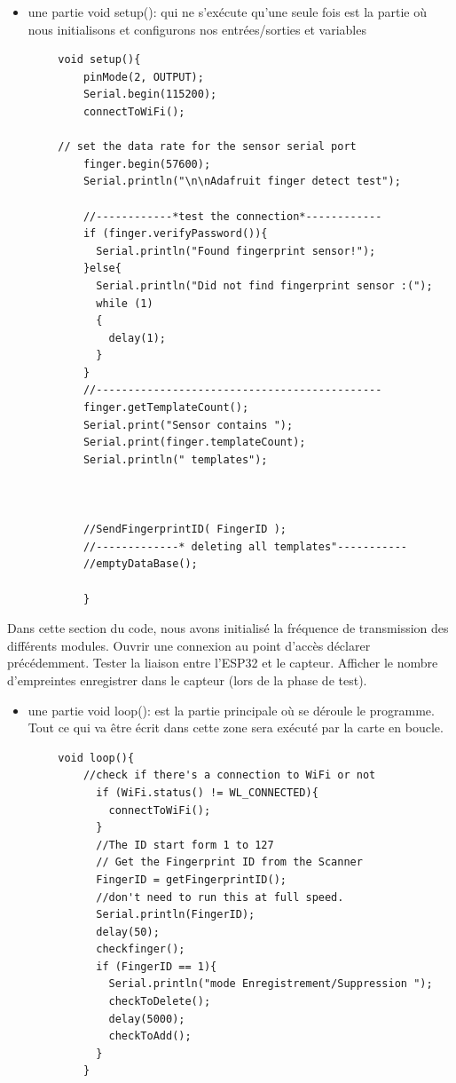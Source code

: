     \begin{itemize}
        \item [\textbullet] une partie void setup(): qui ne s’exécute qu’une seule fois 
        est la partie où nous initialisons et configurons nos entrées/sorties et 
        variables 
    \end{itemize}    
    \begin{verbatim}
        void setup(){
            pinMode(2, OUTPUT);
            Serial.begin(115200);
            connectToWiFi();

        // set the data rate for the sensor serial port
            finger.begin(57600);
            Serial.println("\n\nAdafruit finger detect test");
            
            //------------*test the connection*------------
            if (finger.verifyPassword()){
              Serial.println("Found fingerprint sensor!");
            }else{
              Serial.println("Did not find fingerprint sensor :(");
              while (1)
              {
                delay(1);
              }
            }
            //---------------------------------------------
            finger.getTemplateCount();
            Serial.print("Sensor contains ");
            Serial.print(finger.templateCount);
            Serial.println(" templates");
            
 
            
            //SendFingerprintID( FingerID );
            //-------------* deleting all templates"-----------
            //emptyDataBase();
        
            }
    \end{verbatim}
Dans cette section du code, nous avons initialisé la fréquence de transmission 
des différents modules. Ouvrir une connexion au point d’accès déclarer 
précédemment. Tester la liaison entre l’ESP32 et le capteur. Afficher le nombre
d’empreintes enregistrer dans le capteur (lors de la phase de test).      
        
    \begin{itemize}
        \item [\textbullet] une partie void loop(): est la partie principale où se 
            déroule le programme. Tout ce qui va être écrit dans cette zone sera exécuté 
            par la carte en boucle. 
    \end{itemize}
    \begin{verbatim}
        void loop(){
            //check if there's a connection to WiFi or not
              if (WiFi.status() != WL_CONNECTED){
                connectToWiFi();
              }
              //The ID start form 1 to 127
              // Get the Fingerprint ID from the Scanner
              FingerID = getFingerprintID(); 
              //don't need to run this at full speed.
              Serial.println(FingerID);
              delay(50);
              checkfinger();
              if (FingerID == 1){
                Serial.println("mode Enregistrement/Suppression ");
                checkToDelete();
                delay(5000);
                checkToAdd();
              }
            }
    \end{verbatim}

